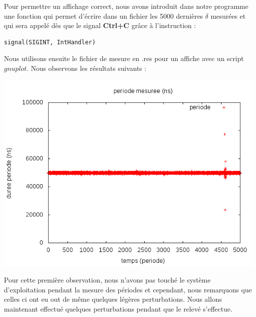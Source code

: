 Pour permettre un affichage correct, nous avons introduit dans notre programme une fonction qui permet d'écrire dans un fichier les 5000 dernières $\delta$ mesurées et qui sera appelé dès que le signal \textbf{Ctrl+C} grâce à l'instruction : 
\begin{lstlisting}[style = customc]
signal(SIGINT, IntHandler)
\end{lstlisting} 
Nous utilisons ensuite le fichier de mesure en .res pour un affiche avec un script $gnuplot$. Nous observons les résultats suivants :
\begin{center}
\includegraphics[width = .8\textwidth]{./I/images/delta_no_perturb.png}
\end{center}

Pour cette première observation, nous n'avons pas touché le système d'exploitation pendant la mesure des périodes et cependant, nous remarquons que celles ci ont eu out de même quelques légères perturbations. Nous allons maintenant effectué quelques perturbations pendant que le relevé s'effectue. 

